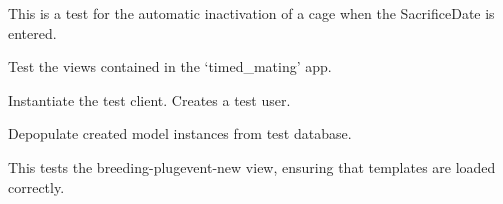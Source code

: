\documentclass[letterpaper,10pt,english]{sphinxmanual}
\begin{document}
\begin{fulllineitems}

\begin{fulllineitems}
\label{timed_mating:mousedb.timed_mating.tests.Timed_MatingModelTests.test_set_plugevent_inactive}
This is a test for the automatic inactivation of a cage when the SacrificeDate is entered.

\end{fulllineitems}


\end{fulllineitems}


\begin{fulllineitems}
\label{timed_mating:mousedb.timed_mating.tests.Timed_MatingViewTests}
Test the views contained in the `timed\_mating' app.

\begin{fulllineitems}
\label{timed_mating:mousedb.timed_mating.tests.Timed_MatingViewTests.setUp}
Instantiate the test client.  Creates a test user.

\end{fulllineitems}


\begin{fulllineitems}
\label{timed_mating:mousedb.timed_mating.tests.Timed_MatingViewTests.tearDown}
Depopulate created model instances from test database.

\end{fulllineitems}


\begin{fulllineitems}
\label{timed_mating:mousedb.timed_mating.tests.Timed_MatingViewTests.test_breeding_plugevent_new}
This tests the breeding-plugevent-new view, ensuring that templates are loaded correctly.


\end{fulllineitems}
\end{fulllineitems}
\end{document}
